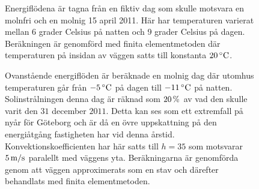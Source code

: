 \begin{figure}
\caption{Energiflödena är tagna från en fiktiv dag som skulle motsvara en molnfri
och en molnig
15 april 2011. Här har temperaturen varierat mellan 6 grader Celsius på natten och
9 grader Celsius på dagen. Beräkningen är genomförd med finita elementmetoden där
temperaturen på insidan av väggen satts till konstanta $\unit[20]{^\circ C}$.}
\end{figure}


\begin{figure}
\centering
{}
\vspace{5mm}
\caption{Ovanstående energiflöden är beräknade en molnig dag där
utomhus temperaturen går från $\unit[-5]{^\circ C}$ på dagen
till $\unit[-11]{^\circ C}$ på natten. Solinstrålningen denna dag är
räknad som $\unit[20]{\%}$ av vad den skulle varit den $31$ december $2011$.
Detta kan ses som ett extremfall på nyår för Göteborg och är då en övre
uppskattning på den energiåtgång fastigheten har vid denna årstid.
Konvektionskoefficienten har här satts till $h=35$ som motsvarar
$\unit[5]{m/s}$ paralellt med väggens yta. Beräkningarna är genomförda
genom att väggen approximerats som en stav och därefter behandlats med
finita elementmetoden.}
\end{figure}

